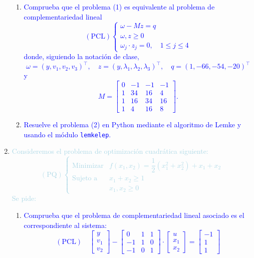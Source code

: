 \documentclass[a4paper]{article}
\newcommand{\lb}[1]{\textcolor{lightblue}{#1}}
\newcommand{\db}[1]{\textcolor{blue}{#1}}
\begin{document}
\begin{enumerate}[label=\color{red}\arabic*.]
\begin{enumerate}[label=\color{red}\alph*)]
    	\item \db{Comprueba que el problema (1) es equivalente al problema de complementariedad lineal \begin{equation}
    	(\mathrm{PCL})\begin{cases}
    	\omega-Mz=q\\
    	\omega,z\ge0\\
    	\omega_j\cdot z_j=0,\quad 1\le j\le4
    	\end{cases}
    	\end{equation}donde, siguiendo la notación de clase, \[ \omega=(y,v_1,v_2,v_3)^\intercal,\quad z=(y,\lambda_1,\lambda_2,\lambda_3)^\intercal,\quad q=(1,-66,-54,-20)^\intercal \]y\[ M=\begin{bmatrix}
    	0 & -1 & -1 & -1 \\
    	1 & 34 & 16 & 4 \\
    	1 & 16 & 34 & 16 \\
    	1 & 4 & 16 & 8
    	\end{bmatrix}. \]}
    	
    	\item \db{Resuelve el problema (2) en Python mediante el algoritmo de Lemke y usando el módulo \texttt{lemkelep}.}
    	
    \end{enumerate}
    \item \lb{Consideremos el problema de optimización cuadrática siguiente: \[ (\mathrm{PQ})\begin{cases}
    \text{Minimizar} & f(x_{1},x_{2})=\dfrac{1}{2}(x_{1}^{2}+x_{2}^{2})+x_{1}+x_{2}\\
    \text{Sujeto a} & x_1+x_2\ge1\\
     & x_1,x_2\ge0
    \end{cases} \]Se pide:}
    \begin{enumerate}[label=\color{red}\alph*)]
    	\item \db{Comprueba que el problema de complementariedad lineal asociado es el correspondiente al sistema: \[ (\mathrm{PCL})\quad\begin{bmatrix}
    	y\\
    	v_{1}\\
    	v_{2}
    	\end{bmatrix}-\begin{bmatrix}
    	0 & 1 & 1 \\
    	-1 & 1 & 0 \\
    	-1 & 0 & 1
    	\end{bmatrix}\cdot\begin{bmatrix}
    	u\\
    	x_1\\
    	x_2
    	\end{bmatrix} =\begin{bmatrix}
    	-1 \\
    	1 \\
    	1
    	\end{bmatrix}\]}
    	

\end{enumerate}
\end{enumerate}
\end{document}
